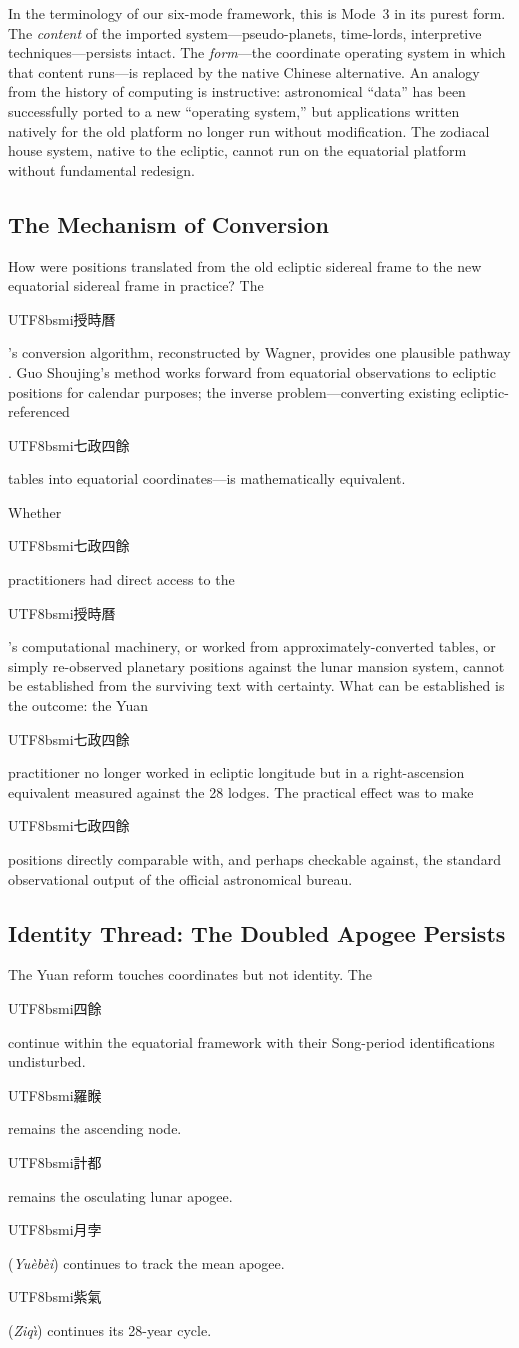 \documentclass[10pt,a4paper]{article}
\newcommand{\zh}[1]{\begin{CJK}{UTF8}{bsmi}#1\end{CJK}}
\begin{document}
In the terminology of our six-mode framework, this is Mode~3 in its
purest form.  The \emph{content} of the imported system---pseudo-planets,
time-lords, interpretive techniques---persists intact.  The
\emph{form}---the coordinate operating system in which that content
runs---is replaced by the native Chinese alternative.  An analogy
from the history of computing is instructive: astronomical
``data'' has been successfully ported to a new ``operating system,''
but applications written natively for the old platform no longer
run without modification.  The zodiacal house system, native to the
ecliptic, cannot run on the equatorial platform without
fundamental redesign.

\subsection*{The Mechanism of Conversion}

How were positions translated from the old ecliptic sidereal frame
to the new equatorial sidereal frame in practice?  The \zh{授時曆}'s
conversion algorithm, reconstructed by Wagner, provides one plausible
pathway \citep{wagner2024gsj}.  Guo Shoujing's method works forward
from equatorial observations to ecliptic positions for calendar
purposes; the inverse problem---converting existing ecliptic-referenced
\zh{七政四餘} tables into equatorial coordinates---is mathematically
equivalent.

Whether \zh{七政四餘} practitioners had direct access to the
\zh{授時曆}'s computational machinery, or worked from
approximately-converted tables, or simply re-observed planetary
positions against the lunar mansion system, cannot be established
from the surviving text with certainty.  What can be established
is the outcome: the Yuan \zh{七政四餘} practitioner no longer
worked in ecliptic longitude but in a right-ascension equivalent
measured against the 28 lodges.  The practical effect was to make
\zh{七政四餘} positions directly comparable with, and perhaps
checkable against, the standard observational output of the
official astronomical bureau.

\subsection*{Identity Thread: The Doubled Apogee Persists}

The Yuan reform touches coordinates but not identity.  The \zh{四餘}
continue within the equatorial framework with their Song-period
identifications undisturbed.  \zh{羅睺} remains the ascending
node.  \zh{計都} remains the osculating lunar apogee.  \zh{月孛}
(\textit{Yu\`eb\`ei}) continues to track the mean apogee.
\zh{紫氣} (\textit{Ziq\`{\i}}) continues its 28-year cycle.
\end{document}
